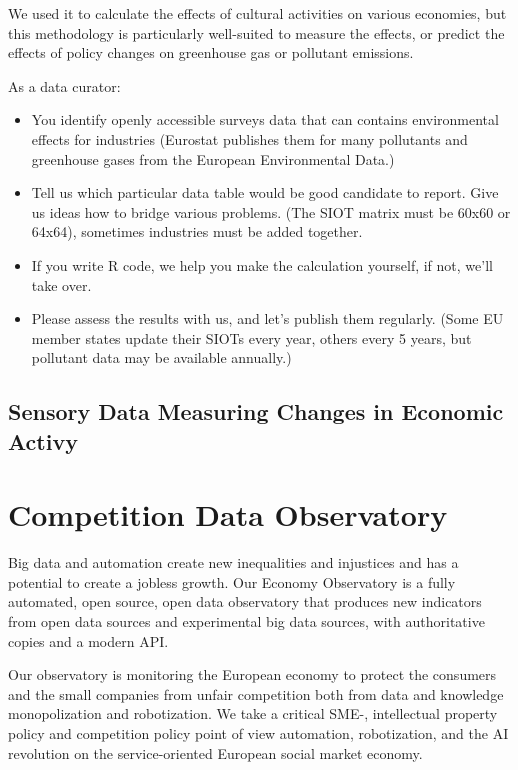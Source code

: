 \documentclass[
  a4paper,
  openany, a4paper, oneside]{book}
\providecommand{\tightlist}{%
  \setlength{\itemsep}{0pt}\setlength{\parskip}{0pt}}
\begin{document}
We used it to calculate the effects of cultural activities on various economies, but this methodology is particularly well-suited to measure the effects, or predict the effects of policy changes on greenhouse gas or pollutant emissions.

As a data curator:

\begin{itemize}
\tightlist
\item
  You identify openly accessible surveys data that can contains environmental effects for industries (Eurostat publishes them for many pollutants and greenhouse gases from the European Environmental Data.)
\item
  Tell us which particular data table would be good candidate to report. Give us ideas how to bridge various problems. (The SIOT matrix must be 60x60 or 64x64), sometimes industries must be added together.
\item
  If you write R code, we help you make the calculation yourself, if not, we'll take over.\\
\item
  Please assess the results with us, and let's publish them regularly. (Some EU member states update their SIOTs every year, others every 5 years, but pollutant data may be available annually.)
\end{itemize}

\hypertarget{sensory-data-measuring-changes-in-economic-activy}{%
\section{Sensory Data Measuring Changes in Economic Activy}\label{sensory-data-measuring-changes-in-economic-activy}}

\hypertarget{competition}{%
\chapter{Competition Data Observatory}\label{competition}}

Big data and automation create new inequalities and injustices and has a potential to create a jobless growth. Our Economy Observatory is a fully automated, open source, open data observatory that produces new indicators from open data sources and experimental big data sources, with authoritative copies and a modern API.

Our observatory is monitoring the European economy to protect the consumers and the small companies from unfair competition both from data and knowledge monopolization and robotization. We take a critical SME-, intellectual property policy and competition policy point of view automation, robotization, and the AI revolution on the service-oriented European social market economy.
\end{document}
